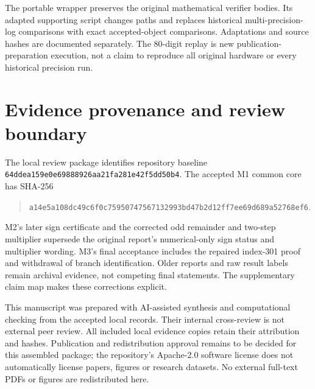 \documentclass[11pt,a4paper]{article}
\begin{document}
The portable wrapper preserves the original mathematical verifier bodies. Its adapted supporting script changes paths and replaces historical multi-precision-log comparisons with exact accepted-object comparisons. Adaptations and source hashes are documented separately. The 80-digit replay is new publication-preparation execution, not a claim to reproduce all original hardware or every historical precision run.

\section{Evidence provenance and review boundary}
The local review package identifies repository baseline \nolinkurl{64ddea159e0e69888926aa21fa281e42f5dd50b4}. The accepted M1 common core has SHA-256
\begin{quote}\small\nolinkurl{a14e5a108dc49c6f0c75950747567132993bd47b2d12ff7ee69d689a52768ef6}.\end{quote}
M2's later sign certificate and the corrected odd remainder and two-step multiplier supersede the original report's numerical-only sign status and multiplier wording. M3's final acceptance includes the repaired index-301 proof and withdrawal of branch identification. Older reports and raw result labels remain archival evidence, not competing final statements. The supplementary claim map makes these corrections explicit.

This manuscript was prepared with AI-assisted synthesis and computational checking from the accepted local records. Their internal cross-review is not external peer review. All included local evidence copies retain their attribution and hashes. Publication and redistribution approval remains to be decided for this assembled package; the repository's Apache-2.0 software license does not automatically license papers, figures or research datasets. No external full-text PDFs or figures are redistributed here.
\end{document}
